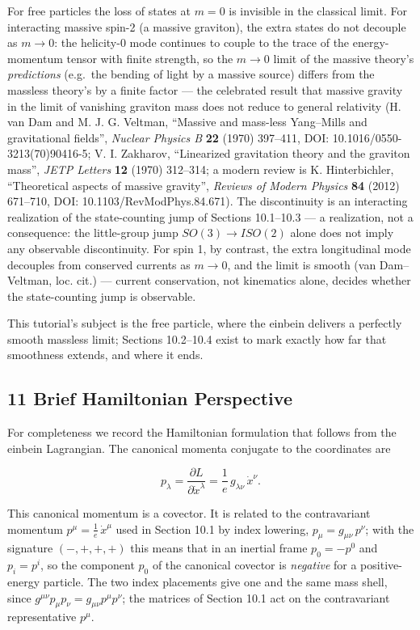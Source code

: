\documentclass[
]{article}
\begin{document}
For free particles the loss of states at \(m = 0\) is invisible in the
classical limit. For interacting massive spin-2 (a massive graviton),
the extra states do not decouple as \(m \to 0\): the helicity-0 mode
continues to couple to the trace of the energy-momentum tensor with
finite strength, so the \(m \to 0\) limit of the massive theory's
\emph{predictions} (e.g.~the bending of light by a massive source)
differs from the massless theory's by a finite factor --- the celebrated
result that massive gravity in the limit of vanishing graviton mass does
not reduce to general relativity (H. van Dam and M. J. G. Veltman,
``Massive and mass-less Yang--Mills and gravitational fields'',
\emph{Nuclear Physics B} \textbf{22} (1970) 397--411, DOI:
10.1016/0550-3213(70)90416-5; V. I. Zakharov, ``Linearized gravitation
theory and the graviton mass'', \emph{JETP Letters} \textbf{12} (1970)
312--314; a modern review is K. Hinterbichler, ``Theoretical aspects of
massive gravity'', \emph{Reviews of Modern Physics} \textbf{84} (2012)
671--710, DOI: 10.1103/RevModPhys.84.671). The discontinuity is an
interacting realization of the state-counting jump of Sections
10.1--10.3 --- a realization, not a consequence: the little-group jump
\(SO(3) \to ISO(2)\) alone does not imply any observable discontinuity.
For spin 1, by contrast, the extra longitudinal mode decouples from
conserved currents as \(m \to 0\), and the limit is smooth (van
Dam--Veltman, loc. cit.) --- current conservation, not kinematics alone,
decides whether the state-counting jump is observable.

This tutorial's subject is the free particle, where the einbein delivers
a perfectly smooth massless limit; Sections 10.2--10.4 exist to mark
exactly how far that smoothness extends, and where it ends.

\hypertarget{brief-hamiltonian-perspective}{%
\subsection{11 Brief Hamiltonian
Perspective}\label{brief-hamiltonian-perspective}}

For completeness we record the Hamiltonian formulation that follows from
the einbein Lagrangian. The canonical momenta conjugate to the
coordinates are

\[p_{\lambda} = \frac{\partial L}{\partial \dot{x}^{\lambda}} = \frac{1}{e}\, g_{\lambda\nu}\, \dot{x}^{\nu}. \tag{71}\]

This canonical momentum is a covector. It is related to the
contravariant momentum \(p^{\mu} = \frac{1}{e}\, \dot{x}^{\mu}\) used in
Section 10.1 by index lowering, \(p_{\mu} = g_{\mu\nu}\, p^{\nu}\); with
the signature \((-, +, +, +)\) this means that in an inertial frame
\(p_{0} = -p^{0}\) and \(p_{i} = p^{i}\), so the component \(p_{0}\) of
the canonical covector is \emph{negative} for a positive-energy
particle. The two index placements give one and the same mass shell,
since \(g^{\mu\nu} p_{\mu} p_{\nu} = g_{\mu\nu} p^{\mu} p^{\nu}\); the
matrices of Section 10.1 act on the contravariant representative
\(p^{\mu}\).
\end{document}
